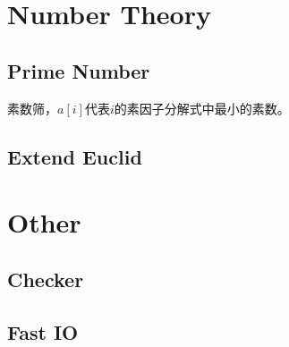 \documentclass[twoside, UTF8]{article}
\begin{document}
	\section{Number Theory}
		\subsection{Prime Number}
			\begin{flushleft}
				素数筛，$a[i]$代表$i$的素因子分解式中最小的素数。
			\end{flushleft}
			
		\subsection{Extend Euclid}
			
	\newpage
	\section{Other}
		\subsection{Checker}
			
		\subsection{Fast IO}
			
\end{document}
